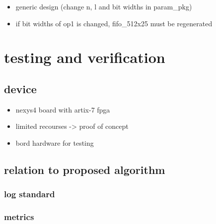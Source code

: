 \documentclass[mscthesis]{usiinfthesis}
\begin{document}
\begin{itemize}
    \item generic design (change n, l and bit widths in param\_pkg)
    \item if bit widths of op1 is changed, fifo\_512x25 must be regenerated
\end{itemize}

\chapter{testing and verification}
\label{ch:test}

\section{device}
\label{ch:test_dev}

\begin{itemize}
    \item nexys4 board with artix-7 fpga
    \item limited recourses -> proof of concept
    \item bord hardware for testing
\end{itemize}

\section{relation to proposed algorithm}
\label{ch:test_prop}

\subsection{log standard}

\subsection{metrics}
\end{document}
